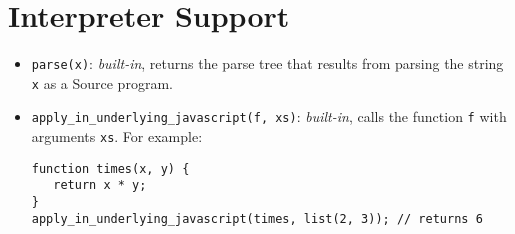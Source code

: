 \section*{Interpreter Support}

\begin{itemize}
\item \lstinline{parse(x)}: \textit{built-in}, returns the parse tree that results from parsing
the string \lstinline{x} as a Source program.
\item \lstinline{apply_in_underlying_javascript(f, xs)}: \textit{built-in}, calls the function \lstinline{f}
with arguments \lstinline{xs}. For example:
\begin{lstlisting}
function times(x, y) {
   return x * y;
}
apply_in_underlying_javascript(times, list(2, 3)); // returns 6
\end{lstlisting}
\end{itemize}
